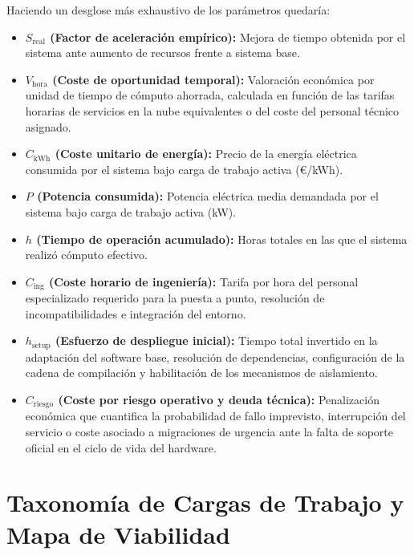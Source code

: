\documentclass[a4paper,11pt]{article}
\begin{document}
\noindent Haciendo un desglose más exhaustivo de los parámetros quedaría:
\begin{itemize}[leftmargin=*,labelsep=0.5em,itemsep=0.8ex]
    \item \textbf{$S_{\text{real}}$ (Factor de aceleración empírico):} Mejora de tiempo obtenida por el sistema 
    ante aumento de recursos frente a sistema base.
    \item \textbf{$V_{\text{hora}}$ (Coste de oportunidad temporal):} Valoración económica por unidad de tiempo de 
    cómputo ahorrada, calculada en función de las tarifas horarias de servicios en la nube equivalentes o del coste del 
    personal técnico asignado.
    \item \textbf{$C_{\text{kWh}}$ (Coste unitario de energía):} Precio de la energía eléctrica consumida por el sistema 
    bajo carga de trabajo activa (\euro/kWh).
    \item \textbf{$P$ (Potencia consumida):} Potencia eléctrica media demandada por el sistema bajo carga de trabajo
    activa (kW).
    \item \textbf{$h$ (Tiempo de operación acumulado):} Horas totales en las que el sistema realizó cómputo efectivo. 
    \item \textbf{$C_{\text{ing}}$ (Coste horario de ingeniería):} Tarifa por hora del personal especializado requerido 
    para la puesta a punto, resolución de incompatibilidades e integración del entorno.
    \item \textbf{$h_{\text{setup}}$ (Esfuerzo de despliegue inicial):} Tiempo total invertido en la adaptación del 
    software base, resolución de dependencias, configuración de la cadena de compilación y habilitación de los mecanismos de aislamiento.
    \item \textbf{$C_{\text{riesgo}}$ (Coste por riesgo operativo y deuda técnica):} Penalización económica que 
    cuantifica la probabilidad de fallo imprevisto, interrupción del servicio o coste asociado a migraciones de urgencia
    ante la falta de soporte oficial en el ciclo de vida del hardware.
\end{itemize}


\section{Taxonomía de Cargas de Trabajo y Mapa de Viabilidad}\label{sec:taxonomia}
\end{document}
